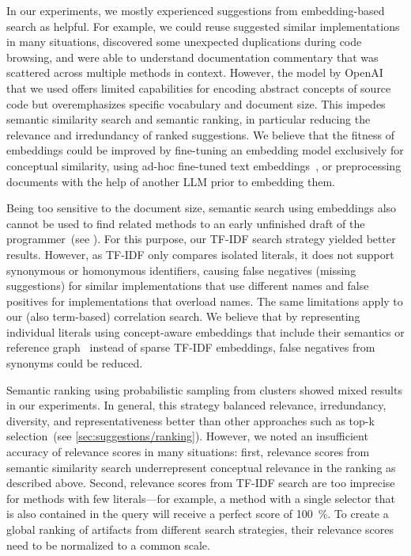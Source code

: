 In our experiments, we mostly experienced suggestions from embedding-based search as helpful.
For example, we could reuse suggested similar implementations in many situations, discovered some unexpected duplications during code browsing, and were able to understand documentation commentary that was scattered across multiple methods in context.
However, the  model by OpenAI that we used offers limited capabilities for encoding abstract concepts of source code but overemphasizes specific vocabulary and document size.
This impedes semantic similarity search and semantic ranking, in particular reducing the relevance and irredundancy of ranked suggestions.
We believe that the fitness of embeddings could be improved by fine-tuning an embedding model exclusively for conceptual similarity, using ad-hoc fine-tuned text embeddings~\cite{su2023one}, or preprocessing documents with the help of another LLM prior to embedding them.

Being too sensitive to the document size, semantic search using embeddings also cannot be used to find related methods to an early unfinished draft of the programmer~(see ).
For this purpose, our TF-IDF search strategy yielded better results.
However, as TF-IDF only compares isolated literals, it does not support synonymous or homonymous identifiers, causing false negatives (missing suggestions) for similar implementations that use different names and false positives for implementations that overload names.
The same limitations apply to our (also term-based) correlation search.
We believe that by representing individual literals using concept-aware embeddings that include their semantics or reference graph~\cite{mattis2018semantic} instead of sparse TF-IDF embeddings, false negatives from synonyms could be reduced.

Semantic ranking using probabilistic sampling from clusters showed mixed results in our experiments.
In general, this strategy balanced relevance, irredundancy, diversity, and representativeness better than other approaches such as top-k selection~(see \cref{sec:suggestions/ranking}).
However, we noted an insufficient accuracy of relevance scores in many situations:
first, relevance scores from semantic similarity search underrepresent conceptual relevance in the ranking as described above.
Second, relevance scores from TF-IDF search are too imprecise for methods with few literals---for example, a method with a single selector that is also contained in the query will receive a perfect score of \qty{100}{\percent}.
To create a global ranking of artifacts from different search strategies, their relevance scores need to be normalized to a common scale.

